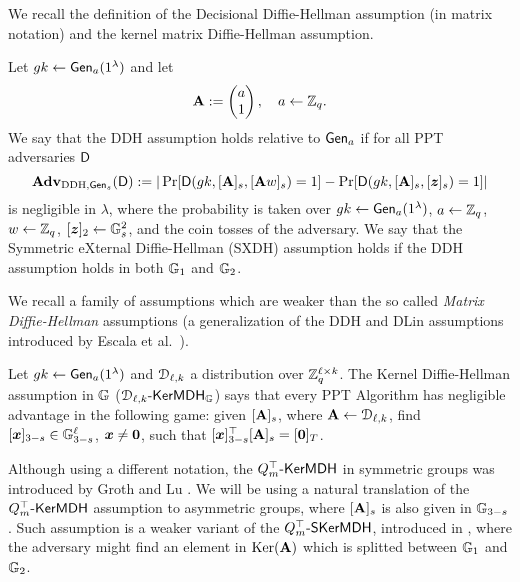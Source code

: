 We recall the definition of the Decisional Diffie-Hellman assumption (in matrix notation) and the kernel matrix Diffie-Hellman assumption.

\begin{definition}\label{def:dlin}
 Let  ${gk} 
\gets \mathsf{Gen}_a(1^\lambda)$ and let
$$
\mathbf{{A}} :=
\begin{pmatrix} 
a     \\
1
\end{pmatrix},
\quad
a\gets\mathbb{Z}_q.
$$
We say that the DDH assumption holds relative to $\mathsf{Gen}_a$ if for all PPT adversaries $\mathsf{D}$
$$
\mathbf{Adv}_{\mathrm{DDH},\mathsf{Gen}_s}(\mathsf{D}) := |
	\Pr[
		\mathsf{D}(
			gk,
			[\mathbf{{A}}]_s,
			[\mathbf{{A}}{w}]_s)=1]
	-\Pr[
		\mathsf{D}(
		gk,
		[\mathbf{{A}}]_s,
		[{\boldsymbol{z}}]_s)=1]|
$$
is negligible in $\lambda$, where the probability is taken over $gk\gets\mathsf{Gen}_a(1^\lambda)$, $a\gets\mathbb{Z}_q$, ${w}\gets\mathbb{Z}_q$, $[{\boldsymbol{z}}]_2\gets\mathbb{G}^2_s$, and the coin tosses of the adversary.
We say that the Symmetric eXternal Diffie-Hellman (SXDH) assumption holds if the DDH assumption holds in both $\mathbb{G}_1$ and $\mathbb{G}_2$.
\end{definition}

We recall a family of assumptions which are weaker than the so called \emph{Matrix Diffie-Hellman} assumptions (a generalization of the DDH and DLin assumptions introduced by Escala et al.~\cite{C:EHKRV13}).
\begin{definition} Let  ${gk} 
\gets\mathsf{Gen}_a(1^\lambda)$ and $\mathcal{D}_{\ell,k}$ a distribution over $\mathbb{Z}_q^{\ell\times k}$.
The Kernel Diffie-Hellman assumption in $\mathbb{G}$ ($\mathcal{D}_{\ell,k}\mbox{-}\mathsf{KerMDH}_{\mathbb{G}}$) says that every PPT Algorithm has negligible advantage in the following  game: given $[\mathbf{{A}}]_s$, where $\mathbf{{A}} \gets \mathcal{D}_{\ell,k}$, find $[{\boldsymbol{x}}]_{3-s} \in \mathbb{G}^{\ell}_{3-s}$, ${\boldsymbol{x}} \neq {\boldsymbol{0}}$, such that 
$[{\boldsymbol{x}}]_{3-s}^{\top}[\mathbf{{A}}]_s=[{\boldsymbol{0}}]_T$. 
\end{definition}
Although using a different notation, the $Q_m^\top\mbox{-}\mathsf{KerMDH}$ in symmetric groups was introduced by Groth and Lu \cite{AC:GroLu07}.
We will be using a natural translation of the $Q_m^\top\mbox{-}\mathsf{KerMDH}$ assumption to asymmetric groups, where  $[\mathbf{{A}}]_s$ is also given in $\mathbb{G}_{3-s}$.  Such assumption is a weaker variant of the $Q_m^\top\mbox{-}\mathsf{SKerMDH}$, introduced in \cite{AC:GonHevRaf15}, where the adversary might find an element in $\mathrm{Ker}(\mathbf{{A}})$ which is splitted between $\mathbb{G}_1$ and $\mathbb{G}_2$.

